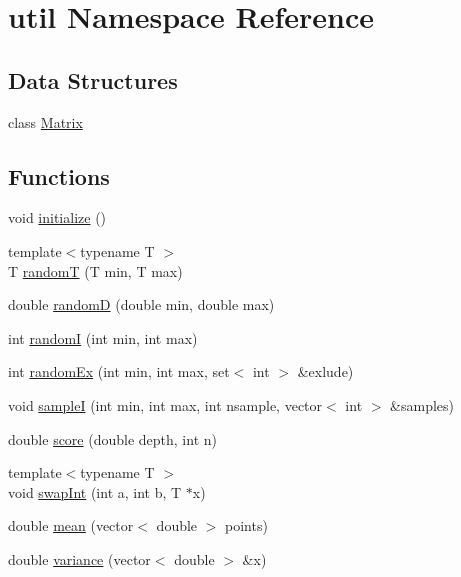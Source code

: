 \hypertarget{namespaceutil}{}\section{util Namespace Reference}
\label{namespaceutil}
\subsection*{Data Structures}
\begin{DoxyCompactItemize}
\item 
class \hyperlink{classutil_1_1Matrix}{Matrix}
\end{DoxyCompactItemize}
\subsection*{Functions}
\begin{DoxyCompactItemize}
\item 
void \hyperlink{namespaceutil_a60fc54ed78936dca89472845766b61f8}{initialize} ()
\item 
{\footnotesize template$<$typename T $>$ }\\T \hyperlink{namespaceutil_a254d46b3ebe9a685b6e0eca9db9d51ec}{randomT} (T min, T max)
\item 
double \hyperlink{namespaceutil_a1327645fe6fef26083bc9e1185b8d586}{randomD} (double min, double max)
\item 
int \hyperlink{namespaceutil_ab473893d6b386b2da951b72b4d40c085}{randomI} (int min, int max)
\item 
int \hyperlink{namespaceutil_a8751577b60f8e83b41c3cca32d65b677}{random\+Ex} (int min, int max, set$<$ int $>$ \&exlude)
\item 
void \hyperlink{namespaceutil_ab4e338c554526c6a942fc35d14b15beb}{sampleI} (int min, int max, int nsample, vector$<$ int $>$ \&samples)
\item 
double \hyperlink{namespaceutil_a71809e272f5a9c8e8297bab2c12666f7}{score} (double depth, int n)
\item 
{\footnotesize template$<$typename T $>$ }\\void \hyperlink{namespaceutil_a998845d03758baa45e52b967cf230b01}{swap\+Int} (int a, int b, T $\ast$x)
\item 
double \hyperlink{namespaceutil_afded8090794a80d2f1c9aa44e70c85ff}{mean} (vector$<$ double $>$ points)
\item 
double \hyperlink{namespaceutil_a43a50c7b5c6674cd27461d91cfec686c}{variance} (vector$<$ double $>$ \&x)
\item 

\end{DoxyCompactItemize}
